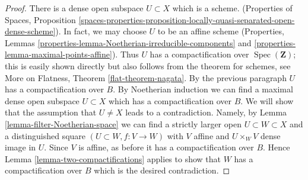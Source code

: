 \documentclass[10pt,a4paper]{amsart}
\theoremstyle{plain}
\theoremstyle{definition}
\theoremstyle{remark}
\numberwithin{equation}{subsection}
\def\Spec{\mathop{\mathrm{Spec}}}
\begin{document}
\begin{proof}
\medskip\noindent
There is a dense open subspace $U \subset X$ which is a scheme.
(Properties of Spaces, Proposition
\ref{spaces-properties-proposition-locally-quasi-separated-open-dense-scheme}).
In fact, we may choose $U$ to be an affine scheme
(Properties, Lemmas \ref{properties-lemma-Noetherian-irreducible-components}
and \ref{properties-lemma-maximal-points-affine}).
Thus $U$ has a compactification over $\Spec(\mathbf{Z})$;
this is easily shown directly but also follows from the
theorem for schemes, see
More on Flatness, Theorem \ref{flat-theorem-nagata}.
By the previous paragraph $U$ has a compactification over $B$. 
By Noetherian induction we can find a maximal dense open subspace
$U \subset X$ which has a compactification over $B$. We will show
that the assumption that $U \not = X$ leads to a contradiction.
Namely, by Lemma \ref{lemma-filter-Noetherian-space}
we can find a strictly larger open $U \subset W \subset X$
and a distinguished square $(U \subset W, f : V \to W)$
with $V$ affine and $U \times_W V$ dense image in $U$.
Since $V$ is affine, as before it has a compactification over $B$. Hence
Lemma \ref{lemma-two-compactifications}
applies to show that $W$ has a compactification over $B$
which is the desired contradiction.
\end{proof}
\end{document}
